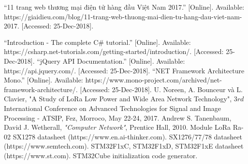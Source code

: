 \thispagestyle{plain}
\begin{thebibliography}{20}

“11 trang web thương mại điện tử hàng đầu Việt Nam 2017.” [Online]. Available: https://giaidieu.com/blog/11-trang-web-thuong-mai-dien-tu-hang-dau-viet-nam-2017. [Accessed: 25-Dec-2018].

“Introduction - The complete C\# tutorial.” [Online]. Available: https://csharp.net-tutorials.com/getting-started/introduction/. [Accessed: 25-Dec-2018].
“jQuery API Documentation.” [Online]. Available: https://api.jquery.com/. [Accessed: 25-Dec-2018].
“NET Framework Architecture Mono.” [Online]. Available: https://www.mono-project.com/archived/net-framework-architecture/. [Accessed: 25-Dec-2018].
U. Noreen, A. Bounceur và L. Clavier, "A Study of LoRa Low Power and Wide Area Network Technology", 3${rd}$ International Conference on Advanced Technologies for Signal and Image Processing - ATSIP, Fez, Morroco, May 22-24, 2017.
Andrew S. Tanenbaum, David J. Wetherall, \textit{"Computer Network"}, Prentice Hall, 2010.
Module LoRa Ra-02 SX1278 datasheet (https://www.en.ai-thinker.com).
SX1276/77/78 datasheet (https://www.semtech.com).
STM32F1xC, STM32F1xD, STM32F1xE datasheet (https://www.st.com).
STM32Cube initialization code generator.
\end{thebibliography}